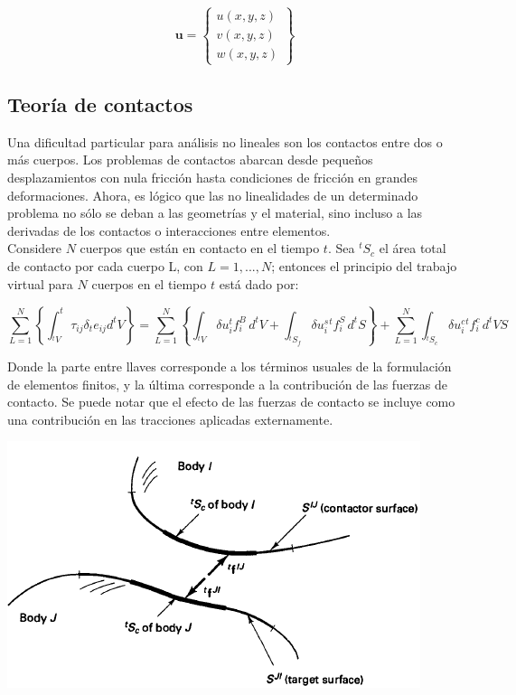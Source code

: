 \begin{equation}
\bm{u} = \left\{ 
\begin{matrix}
u(x,y,z) \\
v(x,y,z) \\
w(x,y,z)
\end{matrix}
\right\}
\end{equation}


\subsection{Teoría de contactos}

Una dificultad particular para análisis no lineales son los contactos entre dos o más 
cuerpos. Los problemas de contactos abarcan desde pequeños desplazamientos con nula  
fricción hasta condiciones de fricción en grandes deformaciones. Ahora, es lógico que 
las no linealidades de un determinado problema no sólo se deban a las geometrías y el 
material, sino incluso a las derivadas de los contactos o interacciones entre elementos.
~\cite{bathe1996} \\

Considere $N$ cuerpos que están en contacto en el tiempo $t$. Sea $^tS_c$ el área total 
de contacto por cada cuerpo L, con $L=1,...,N$; entonces el principio del trabajo virtual 
para $N$ cuerpos en el tiempo $t$ está dado por:

\begin{equation} \label{eq:contact_n}
\sum\limits_{L=1}^N \left\{ \int_{^tV} ^t\tau_{ij} \delta_t e_{ij} d^t V \right\} = 
\sum\limits_{L=1}^N \left\{ 
\int_{^tV} \delta u_i ^tf_i^B \, d^t V + 
\int_{^tS_f} \delta u_i^s ^tf_i^S \, d^t S
\right\} + 
\sum\limits_{L=1}^N \int_{^tS_c} \delta u_i^c ^tf_i^c \, d^t VS
\end{equation}

Donde la parte entre llaves corresponde a los términos usuales de la formulación de elementos 
finitos, y la última corresponde a la contribución de las fuerzas de contacto. Se puede 
notar que el efecto de las fuerzas de contacto se incluye como una contribución en las 
tracciones aplicadas externamente.\\

\begin{center}
\includegraphics[scale=0.9]{src/ch2/body_contacts.png}
\label{fig:body_contacts}
\end{center}

